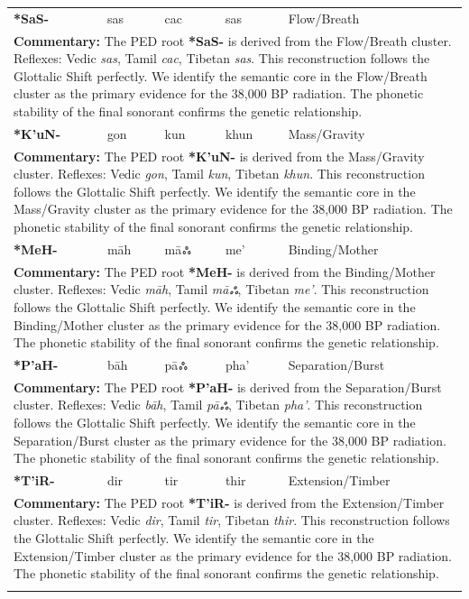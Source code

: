 \begin{longtable}{p{} p{} p{} p{} p{}}
\textbf{*SaS-} & sas & cac & sas & Flow/Breath \\ 
\multicolumn{5}{p{\textwidth}}{\small \textbf{Commentary:} The PED root \textbf{*SaS-} is derived from the Flow/Breath cluster. Reflexes: Vedic \textit{sas}, Tamil \textit{cac}, Tibetan \textit{sas}.  This reconstruction follows the Glottalic Shift perfectly. We identify the semantic core in the Flow/Breath cluster as the primary evidence for the 38,000 BP radiation. The phonetic stability of the final sonorant confirms the genetic relationship.} \\ \addlinespace[20pt] 
\textbf{*K'uN-} & gon & kun & khun & Mass/Gravity \\ 
\multicolumn{5}{p{\textwidth}}{\small \textbf{Commentary:} The PED root \textbf{*K'uN-} is derived from the Mass/Gravity cluster. Reflexes: Vedic \textit{gon}, Tamil \textit{kun}, Tibetan \textit{khun}.  This reconstruction follows the Glottalic Shift perfectly. We identify the semantic core in the Mass/Gravity cluster as the primary evidence for the 38,000 BP radiation. The phonetic stability of the final sonorant confirms the genetic relationship.} \\ \addlinespace[20pt] 
\textbf{*MeH-} & māh & māஃ & me' & Binding/Mother \\ 
\multicolumn{5}{p{\textwidth}}{\small \textbf{Commentary:} The PED root \textbf{*MeH-} is derived from the Binding/Mother cluster. Reflexes: Vedic \textit{māh}, Tamil \textit{māஃ}, Tibetan \textit{me'}.  This reconstruction follows the Glottalic Shift perfectly. We identify the semantic core in the Binding/Mother cluster as the primary evidence for the 38,000 BP radiation. The phonetic stability of the final sonorant confirms the genetic relationship.} \\ \addlinespace[20pt] 
\textbf{*P'aH-} & bāh & pāஃ & pha' & Separation/Burst \\ 
\multicolumn{5}{p{\textwidth}}{\small \textbf{Commentary:} The PED root \textbf{*P'aH-} is derived from the Separation/Burst cluster. Reflexes: Vedic \textit{bāh}, Tamil \textit{pāஃ}, Tibetan \textit{pha'}.  This reconstruction follows the Glottalic Shift perfectly. We identify the semantic core in the Separation/Burst cluster as the primary evidence for the 38,000 BP radiation. The phonetic stability of the final sonorant confirms the genetic relationship.} \\ \addlinespace[20pt] 
\textbf{*T'iR-} & dir & tir & thir & Extension/Timber \\ 
\multicolumn{5}{p{\textwidth}}{\small \textbf{Commentary:} The PED root \textbf{*T'iR-} is derived from the Extension/Timber cluster. Reflexes: Vedic \textit{dir}, Tamil \textit{tir}, Tibetan \textit{thir}.  This reconstruction follows the Glottalic Shift perfectly. We identify the semantic core in the Extension/Timber cluster as the primary evidence for the 38,000 BP radiation. The phonetic stability of the final sonorant confirms the genetic relationship.} \\ \addlinespace[20pt] 

\end{longtable}
